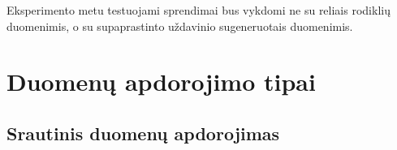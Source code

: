 \documentclass{VUMIFPSkursinis}
\begin{document}
Eksperimento metu testuojami sprendimai bus vykdomi ne su reliais rodiklių duomenimis, o su supaprastinto uždavinio sugeneruotais duomenimis.





\section{Duomenų apdorojimo tipai}

\subsection{Srautinis duomenų apdorojimas} \label{strprocess}
\end{document}
